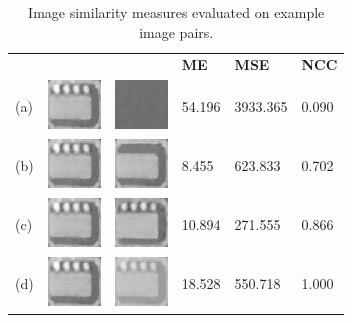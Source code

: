 \begin{table}[h!]
\centering
\begin{tabular}{| m{.02\linewidth} m{.13\linewidth} m{.13\linewidth} m{.12\linewidth} m{.12\linewidth} m{.12\linewidth} | }
\hline
 & & & \textbf{ME} & \textbf{MSE} & \textbf{NCC} \\
(a) & \includegraphics[width=.13\textwidth]{TemplateMatching/img/board_template} & 
\includegraphics[width=.13\textwidth]{TemplateMatching/img/board_tcomp_empty} &
54.196 & 3933.365 & 0.090 \\
(b) & \includegraphics[width=.13\textwidth]{TemplateMatching/img/board_template} & 
\includegraphics[width=.13\textwidth]{TemplateMatching/img/board_tcomp_detail} &
8.455 & 623.833 & 0.702 \\
(c) & \includegraphics[width=.13\textwidth]{TemplateMatching/img/board_template} & 
\includegraphics[width=.13\textwidth]{TemplateMatching/img/board_tcomp_another} &
10.894 & 271.555 & 0.866 \\
(d) & \includegraphics[width=.13\textwidth]{TemplateMatching/img/board_template} & 
\includegraphics[width=.13\textwidth]{TemplateMatching/img/board_tcomp_linear} &
18.528 & 550.718 & 1.000 \\ \hline
\end{tabular}
\caption{Image similarity measures evaluated on example image pairs.}
\label{tab:ImageSimilarityMeasures}
\end{table}

